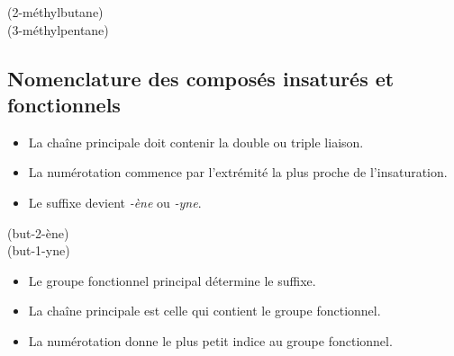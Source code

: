 \begin{exemple}
\begin{center}
\begin{illus}
 \quad (2-méthylbutane)\\[4pt]
 \quad (3-méthylpentane)
\end{illus}
\end{center}
\end{exemple}

\subsection{Nomenclature des composés insaturés et fonctionnels}

\begin{propriete}
\begin{itemize}
    \item La chaîne principale doit contenir la double ou triple liaison.
    \item La numérotation commence par l'extrémité la plus proche de l'insaturation.
    \item Le suffixe devient \textit{-ène} ou \textit{-yne}.
\end{itemize}
\end{propriete}

\begin{exemple}
\begin{center}
\begin{illus}
 \quad (but-2-ène)\\[4pt]
 \quad (but-1-yne)
\end{illus}
\end{center}
\end{exemple}

\begin{propriete}
\begin{itemize}
    \item Le groupe fonctionnel principal détermine le suffixe.
    \item La chaîne principale est celle qui contient le groupe fonctionnel.
    \item La numérotation donne le plus petit indice au groupe fonctionnel.
\end{itemize}
\end{propriete}


